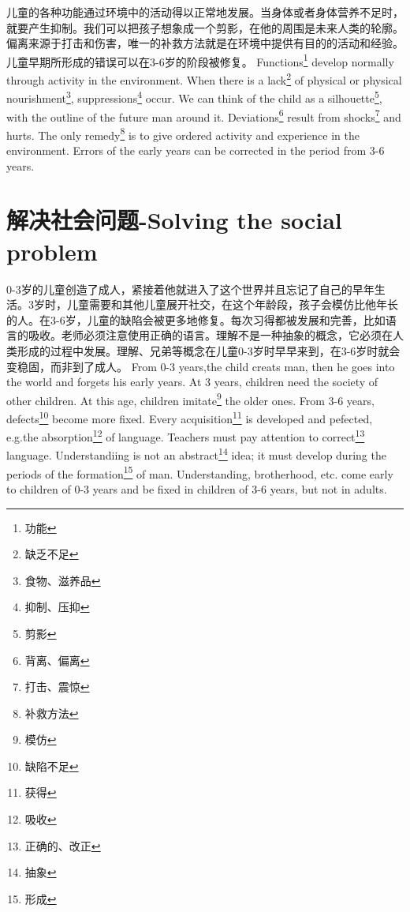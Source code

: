 \documentclass[lang=cn,10pt]{elegantbook}
\begin{document}
\begin{tcolorbox}[title=摘要,
colback=red!5!white,
colframe=red!75!black,
fonttitle=\bfseries]
儿童的各种功能通过环境中的活动得以正常地发展。当身体或者身体营养不足时，就要产生抑制。我们可以把孩子想象成一个剪影，在他的周围是未来人类的轮廓。偏离来源于打击和伤害，唯一的补救方法就是在环境中提供有目的的活动和经验。儿童早期所形成的错误可以在3-6岁的阶段被修复。
Functions\footnote{功能} develop normally through activity in the environment. When there is a lack\footnote{缺乏不足} of physical or physical nourishment\footnote{食物、滋养品}, suppressions\footnote{抑制、压抑} occur. We can think of the child as a silhouette\footnote{剪影}, with the outline of the future man around it. Deviations\footnote{背离、偏离} result from shocks\footnote{打击、震惊} and hurts. The only remedy\footnote{补救方法} is to give ordered activity and experience in the environment. Errors of the early years can be corrected in the period from 3-6 years.
\end{tcolorbox}

\chapter{解决社会问题-Solving the social problem}

\begin{tcolorbox}[title=摘要,
colback=red!5!white,
colframe=red!75!black,
fonttitle=\bfseries]
0-3岁的儿童创造了成人，紧接着他就进入了这个世界并且忘记了自己的早年生活。3岁时，儿童需要和其他儿童展开社交，在这个年龄段，孩子会模仿比他年长的人。在3-6岁，儿童的缺陷会被更多地修复。每次习得都被发展和完善，比如语言的吸收。老师必须注意使用正确的语言。理解不是一种抽象的概念，它必须在人类形成的过程中发展。理解、兄弟等概念在儿童0-3岁时早早来到，在3-6岁时就会变稳固，而非到了成人。
From 0-3 years,the child creats man, then he goes into the world and forgets his early years. At 3 years, children need the society of other children. At this age, children imitate\footnote{模仿} the older ones. From 3-6 years, defects\footnote{缺陷不足} become more fixed. Every acquisition\footnote{获得} is developed and pefected, e.g.the absorption\footnote{吸收} of language. Teachers must pay attention to correct\footnote{正确的、改正} language. Understandiing is not an abstract\footnote{抽象} idea; it must develop during the periods of the formation\footnote{形成} of man. Understanding, brotherhood, etc. come early to children of 0-3 years and be fixed in children of 3-6 years, but not in adults.
\end{tcolorbox}
 
\end{document}
